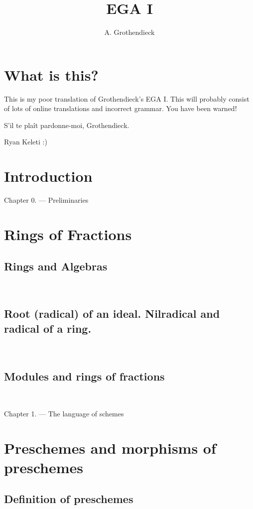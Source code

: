 \documentclass[10pt]{amsart}
\title{EGA I}
\author{A. Grothendieck}
\begin{document}
\maketitle
\tableofcontents{}

\section*{What is this?}

This is my poor translation of Grothendieck's EGA I. This
will probably consist of lots of online translations and incorrect grammar.
You have been warned!

S'il te pla\^it pardonne-moi, Grothendieck.

Ryan Keleti :)

\section*{Introduction}


Chapter 0. --- Preliminaries
\section*{Rings of Fractions}
\subsection*{Rings and Algebras}\mbox{}\\

\subsection*{Root (radical) of an ideal. Nilradical and radical of a ring.}\mbox{}\\

\subsection*{Modules and rings of fractions}\mbox{}\\


\newpage

Chapter 1. --- The language of schemes
\section*{Preschemes and morphisms of preschemes}
\subsection*{Definition of preschemes}\mbox{}\\

\end{document}
